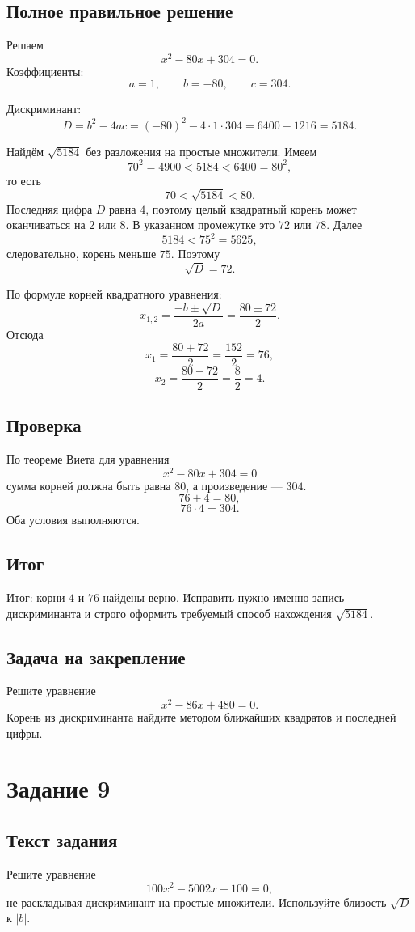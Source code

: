 \documentclass[12pt,a4paper]{article}
\begin{document}
\subsection*{Полное правильное решение}
Решаем
\[
x^2-80x+304=0.
\]
Коэффициенты:
\[
a=1,\qquad b=-80,\qquad c=304.
\]

Дискриминант:
\[
D=b^2-4ac=(-80)^2-4\cdot1\cdot304=6400-1216=5184.
\]

Найдём $\sqrt{5184}$ без разложения на простые множители. Имеем
\[
70^2=4900<5184<6400=80^2,
\]
то есть
\[
70<\sqrt{5184}<80.
\]
Последняя цифра $D$ равна $4$, поэтому целый квадратный корень может оканчиваться на $2$ или $8$. В указанном промежутке это $72$ или $78$. Далее
\[
5184<75^2=5625,
\]
следовательно, корень меньше $75$. Поэтому
\[
\sqrt D=72.
\]

По формуле корней квадратного уравнения:
\[
x_{1,2}=\frac{-b\pm\sqrt D}{2a}
=\frac{80\pm72}{2}.
\]
Отсюда
\[
x_1=\frac{80+72}{2}=\frac{152}{2}=76,
\]
\[
x_2=\frac{80-72}{2}=\frac{8}{2}=4.
\]

\subsection*{Проверка}
По теореме Виета для уравнения
\[
x^2-80x+304=0
\]
сумма корней должна быть равна $80$, а произведение --- $304$.
\[
76+4=80,
\]
\[
76\cdot4=304.
\]
Оба условия выполняются.

\subsection*{Итог}
\textcolor{teal!60!black}{Итог:} корни $4$ и $76$ найдены верно. Исправить нужно именно запись дискриминанта и строго оформить требуемый способ нахождения $\sqrt{5184}$.

\subsection*{Задача на закрепление}
Решите уравнение
\[
x^2-86x+480=0.
\]
Корень из дискриминанта найдите методом ближайших квадратов и последней цифры.

\newpage
{}\label{task:9}
\section*{Задание 9}

\subsection*{Текст задания}
Решите уравнение
\[
100x^2-5002x+100=0,
\]
не раскладывая дискриминант на простые множители. Используйте близость $\sqrt D$ к $|b|$.
\end{document}
